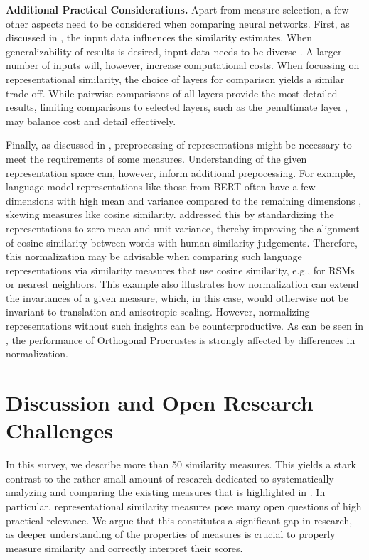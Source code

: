 \documentclass{article}
\newcommand{\citet}{\textcite}
\newcommand{\subheader}{\textbf}
\begin{document}
\subheader{Additional Practical Considerations.}
Apart from measure selection, a few other aspects need to be considered when comparing neural networks.
First, as discussed in , the input data influences the similarity estimates.
When generalizability of results is desired, input data needs to be diverse \cite{sucholutsky_getting_2023}.
A larger number of inputs will, however, increase computational costs.
When focussing on representational similarity, the choice of layers for comparison yields a similar trade-off.
While pairwise comparisons of all layers provide the most detailed results, limiting comparisons to selected layers, such as the penultimate layer \cite{klabunde_towards_2023,jones_if_2022,nanda_measuring_2022}, may balance cost and detail effectively.

Finally, as discussed in , preprocessing of representations might be necessary to meet the requirements of some measures.
Understanding of the given representation space can, however, inform additional prepocessing.
For example,  language model representations like those from BERT \cite{devlin_bert_2019} often have a few dimensions with high mean and variance compared to the remaining dimensions \cite{timkey_rogue_2021}, skewing measures like cosine similarity.
\citet{timkey_rogue_2021} addressed this by standardizing the representations to zero mean and unit variance, thereby improving the alignment of cosine similarity between words with human similarity judgements.
Therefore, this normalization may be advisable when comparing such language representations via similarity measures that use cosine similarity, e.g., for RSMs or nearest neighbors.
This example also illustrates how normalization can extend the invariances of a given measure, which, in this case, would otherwise not be invariant to translation and anisotropic scaling.
However, normalizing representations without such insights can be counterproductive.
As can be seen in , the performance of Orthogonal Procrustes is strongly affected by differences in normalization.



\section{Discussion and Open Research Challenges}
In this survey, we describe more than 50 similarity measures.
This yields a stark contrast to the rather small amount of research dedicated to systematically analyzing and comparing the existing measures that is highlighted in .
In particular, representational similarity measures pose many open questions of high practical relevance.
We argue that this constitutes a significant gap in research, as deeper understanding of the properties of measures is crucial to properly measure similarity and correctly interpret their scores.
\end{document}
